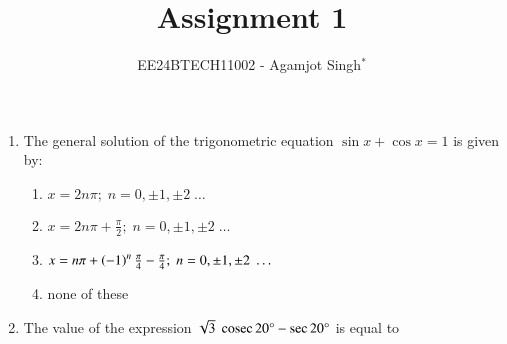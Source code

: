 \documentclass[journal,12pt,twocolumn]{IEEEtran}
\theoremstyle{remark}
\begin{document}

\title{Assignment 1}
\author{EE24BTECH11002 - Agamjot Singh$^{*}$%
}
\maketitle
\newpage
\bigskip

\begin{enumerate}
\section*{ C. MCQs with One Correct Answer}
    \setcounter{enumi}{4}

    \item The general solution of the trigonometric equation $\sin {x} + \cos{x} = 1$ is given by:
        
        \hfill{}
        \begin{enumerate}
            \item $x = 2n\pi;\;n = 0,\pm1,\pm2\;\dots$
            \item $x = 2n\pi+\frac{\pi}{2};\;n = 0,\pm1,\pm2\;\dots$
            \item $x = n\pi+\left(-1\right)^n\frac{\pi}{4}-\frac{\pi}{4};\;n = 0,\pm1,\pm2\;\dots$
            \item none of these
        \end{enumerate}

    \item The value of the expression $\sqrt{3}\;\,\text{cosec}\,{20\degree}-\sec{20\degree}$ is equal to
        
        \hfill{}
        \begin{enumerate}
        \end{enumerate}
        

\end{enumerate}
\end{document}
